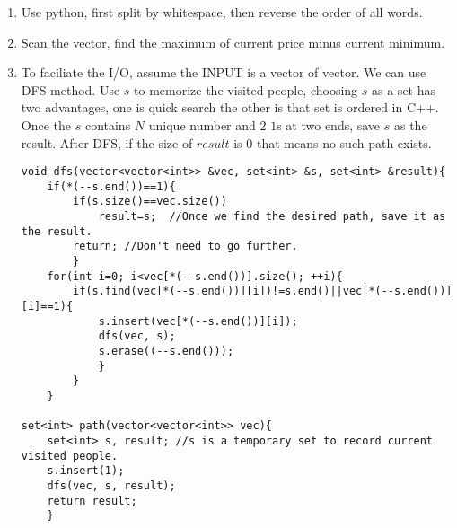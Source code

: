 \documentclass[10pt, onecolumn, draftcls]{IEEEtran}
\begin{document}
\begin{enumerate}
\item
Use python, first split by whitespace, then reverse the order of all words.
\item
Scan the vector, find the maximum of current price minus current minimum. 
\item
To faciliate the I/O, assume the INPUT is a vector of vector. We can use DFS method. Use $s$ to memorize the visited people, choosing $s$ as a set has two advantages, one is quick search the other is that set is ordered in C++. Once the $s$ contains $N$ unique number and $2$ $1$s at two ends, save $s$ as the result. After DFS, if the size of $result$ is $0$ that means no such path exists. 
\begin{lstlisting}
void dfs(vector<vector<int>> &vec, set<int> &s, set<int> &result){
    if(*(--s.end())==1){
        if(s.size()==vec.size())
            result=s;  //Once we find the desired path, save it as the result.
        return; //Don't need to go further.
        }
    for(int i=0; i<vec[*(--s.end())].size(); ++i){
        if(s.find(vec[*(--s.end())][i])!=s.end()||vec[*(--s.end())][i]==1){
            s.insert(vec[*(--s.end())][i]);   
            dfs(vec, s);
            s.erase((--s.end()));   
            }
        }
    }

set<int> path(vector<vector<int>> vec){
    set<int> s, result; //s is a temporary set to record current visited people.
    s.insert(1);
    dfs(vec, s, result);
    return result;
    }
\end{lstlisting}






\end{enumerate}
\end{document}
